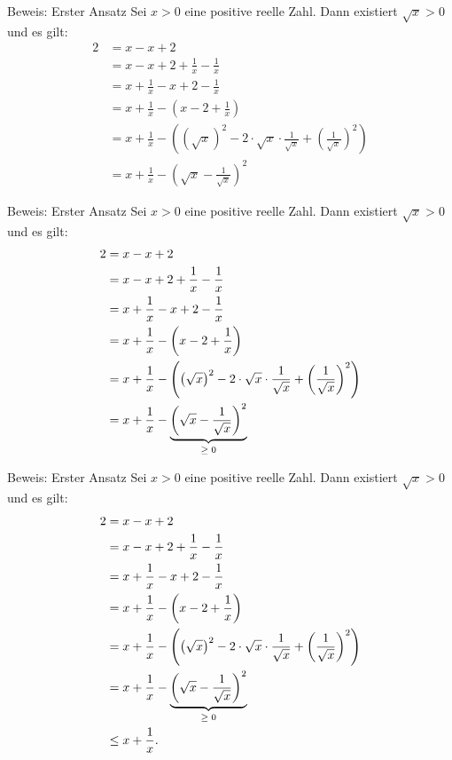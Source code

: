 \documentclass[10pt]{beamer}
\begin{document}
\begin{frame}{Beweis: Erster Ansatz}
    Sei \( x > 0 \) eine positive reelle Zahl. Dann existiert \( \sqrt{x} > 0 \) und es gilt:
    \begin{align*}
        2
        & = x - x + 2 \\
        & = x - x + 2 + \frac{1}{x} - \frac{1}{x} \\
        & = x + \frac{1}{x} - x + 2 - \frac{1}{x} \\
        & = x + \frac{1}{x} - \left( x - 2 + \frac{1}{x} \right) \\
        & = x + \frac{1}{x} - \left( \left( \sqrt{x} \right)^{2} - 2 \cdot \sqrt{x} \cdot \frac{1}{\sqrt{x}} + \left( \frac{1}{\sqrt{x}} \right)^{2} \right) \\
        & = x + \frac{1}{x} - \left( \sqrt{x} - \frac{1}{\sqrt{x}} \right)^{2} 
    \end{align*}
\end{frame}



\begin{frame}{Beweis: Erster Ansatz}
    Sei \( x > 0 \) eine positive reelle Zahl. Dann existiert \( \sqrt{x} > 0 \) und es gilt:
    \begin{align*}
        2
        & = x - x + 2 \\
        & = x - x + 2 + \frac{1}{x} - \frac{1}{x} \\
        & = x + \frac{1}{x} - x + 2 - \frac{1}{x} \\
        & = x + \frac{1}{x} - \left( x - 2 + \frac{1}{x} \right) \\
        & = x + \frac{1}{x} - \left( \left( \sqrt{x} \right)^{2} - 2 \cdot \sqrt{x} \cdot \frac{1}{\sqrt{x}} + \left( \frac{1}{\sqrt{x}} \right)^{2} \right) \\
        & = x + \frac{1}{x} - \underset{\text{\( \geq 0 \)}}{\underbrace{\left( \sqrt{x} - \frac{1}{\sqrt{x}} \right)^{2}}} 
    \end{align*}
\end{frame}



\begin{frame}{Beweis: Erster Ansatz}
    Sei \( x > 0 \) eine positive reelle Zahl. Dann existiert \( \sqrt{x} > 0 \) und es gilt:
    \begin{align*}
        2
        & = x - x + 2 \\
        & = x - x + 2 + \frac{1}{x} - \frac{1}{x} \\
        & = x + \frac{1}{x} - x + 2 - \frac{1}{x} \\
        & = x + \frac{1}{x} - \left( x - 2 + \frac{1}{x} \right) \\
        & = x + \frac{1}{x} - \left( \left( \sqrt{x} \right)^{2} - 2 \cdot \sqrt{x} \cdot \frac{1}{\sqrt{x}} + \left( \frac{1}{\sqrt{x}} \right)^{2} \right) \\
        & = x + \frac{1}{x} - \underset{\text{\( \geq 0 \)}}{\underbrace{\left( \sqrt{x} - \frac{1}{\sqrt{x}} \right)^{2}}} \\
        & \leq x + \frac{1}{x}.
    \end{align*}
\end{frame}
\end{document}
